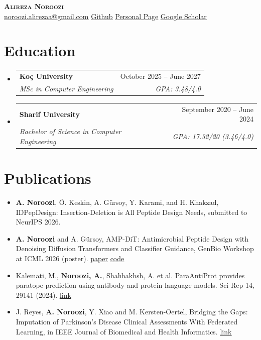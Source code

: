\documentclass[letterpaper,11pt]{article}
\makeatletter
\newcommand{\resumeItem}[1]{\item\small{#1\vspace{-2pt}}}
\newcommand{\resumeSubheading}[4]{
  \vspace{-2pt}\item
    \begin{tabular*}{0.97\textwidth}[t]{l@{\extracolsep{\fill}}r}
      \textbf{#1} & #2 \\
      \textit{\small#3} & \textit{\small #4} \\
    \end{tabular*}\vspace{-7pt}
}
\newcommand{\resumeSubHeadingListStart}{\begin{itemize}[leftmargin=0.15in, label={}]}
\newcommand{\resumeSubHeadingListEnd}{\end{itemize}}
\newcommand{\resumeItemListStart}{\begin{itemize}}
\newcommand{\resumeItemListEnd}{\end{itemize}\vspace{-5pt}}
\makeatother
\begin{document}
\vspace*{12pt}
\begin{center}
    \textbf{\Huge \scshape Alireza Noroozi \\ \vspace{8pt}}
    \href{mailto:noroozi.alirezaa@gmail.com}{\underline{noroozi.alirezaa@gmail.com}}
    \href{https://github.com/Alirzeanoroozi}{\underline{Github}}
    \href{https://alirzeanoroozi.github.io/}{\underline{Personal Page}}
    \href{https://scholar.google.com/citations?user=CzouC0IAAAAJ\&hl=en}{\underline{Google Scholar}}
\end{center}

\section{Education}
  \resumeSubHeadingListStart
    \resumeSubheading
      {Ko\c{c} University}{October 2025 -- June 2027}
      {MSc in Computer Engineering}{GPA: 3.48/4.0}
    \resumeSubheading
      {Sharif University}{September 2020 -- June 2024}
      {Bachelor of Science in Computer Engineering}{GPA: 17.32/20 (3.46/4.0)}
  \resumeSubHeadingListEnd

\section{Publications}
    \resumeItemListStart
        \resumeItem{\textbf{A. Noroozi}, \"{O}. Keskin, A. G\"{u}rsoy, Y. Karami, and H. Khakzad, IDPepDesign: Insertion-Deletion is All Peptide Design Needs, submitted to NeurIPS 2026.}
        \resumeItem{\textbf{A. Noroozi} and A. G\"{u}rsoy, AMP-DiT: Antimicrobial Peptide Design with Denoising Diffusion Transformers and Classifier Guidance, GenBio Workshop at ICML 2026 (poster). \href{https://openreview.net/forum?id=KYzd6lcfZ0}{\underline{paper}} \href{https://github.com/Alirzeanoroozi/DiT-AMP}{\underline{code}}}
        \resumeItem{Kalemati, M., \textbf{Noroozi, A.}, Shahbakhsh, A. et al. ParaAntiProt provides paratope prediction using antibody and protein language models. Sci Rep 14, 29141 (2024). \href{https://doi.org/10.1038/s41598-024-80940-y}{\underline{link}}}
        \resumeItem{J. Reyes, \textbf{A. Noroozi}, Y. Xiao and M. Kersten-Oertel, Bridging the Gaps: Imputation of Parkinson's Disease Clinical Assessments With Federated Learning, in IEEE Journal of Biomedical and Health Informatics. \href{https://ieeexplore.ieee.org/document/11098925}{\underline{link}}}
    \resumeItemListEnd
\end{document}
